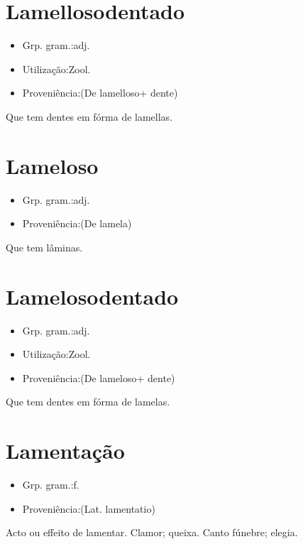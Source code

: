 \section{Lamellosodentado}
\begin{itemize}
\item {Grp. gram.:adj.}
\end{itemize}
\begin{itemize}
\item {Utilização:Zool.}
\end{itemize}
\begin{itemize}
\item {Proveniência:(De \textunderscore lamelloso\textunderscore  + \textunderscore dente\textunderscore )}
\end{itemize}
Que tem dentes em fórma de lamellas.
\section{Lameloso}
\begin{itemize}
\item {Grp. gram.:adj.}
\end{itemize}
\begin{itemize}
\item {Proveniência:(De \textunderscore lamela\textunderscore )}
\end{itemize}
Que tem lâminas.
\section{Lamelosodentado}
\begin{itemize}
\item {Grp. gram.:adj.}
\end{itemize}
\begin{itemize}
\item {Utilização:Zool.}
\end{itemize}
\begin{itemize}
\item {Proveniência:(De \textunderscore lameloso\textunderscore  + \textunderscore dente\textunderscore )}
\end{itemize}
Que tem dentes em fórma de lamelas.
\section{Lamentação}
\begin{itemize}
\item {Grp. gram.:f.}
\end{itemize}
\begin{itemize}
\item {Proveniência:(Lat. \textunderscore lamentatio\textunderscore )}
\end{itemize}
Acto ou effeito de lamentar.
Clamor; queixa.
Canto fúnebre; elegia.
